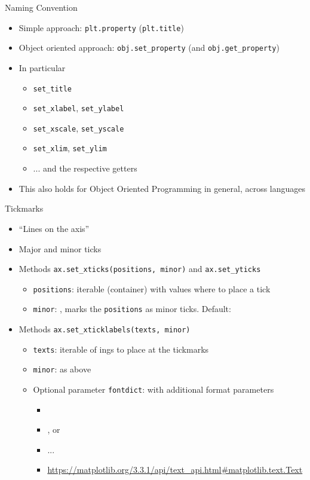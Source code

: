 \begin{frame}[fragile]{Naming Convention}
%
\begin{itemize}
\item Simple approach: \texttt{plt.property} (\eg \texttt{plt.title})
\item Object oriented approach: \texttt{obj.set\_property} (and \texttt{obj.get\_property})
\item In particular
	\begin{itemize}
	\item \texttt{set\_title}
	\item \texttt{set\_xlabel}, \texttt{set\_ylabel}
	\item \texttt{set\_xscale}, \texttt{set\_yscale}
	\item \texttt{set\_xlim}, \texttt{set\_ylim}
	\item ... and the respective getters
	\end{itemize}
\item This also holds for Object Oriented Programming in general, across languages
\end{itemize}
%
\end{frame}


\begin{frame}[fragile]{Tickmarks}
%
\begin{itemize}
\item \enquote{Lines on the axis}
\item Major and minor ticks
\item Methods \texttt{ax.set\_xticks(positions, minor)} and \texttt{ax.set\_yticks}
	\begin{itemize}
	\item \texttt{positions}: iterable (container) with values where to place a tick
	\item \texttt{minor}: , marks the \texttt{positions} as minor ticks. Default: 
	\end{itemize}
\item Methods \texttt{ax.set\_xticklabels(texts, minor)}
	\begin{itemize}
	\item \texttt{texts}: iterable of ings to place at the tickmarks
	\item \texttt{minor}: as above
	\item Optional parameter \texttt{fontdict}:  with additional format parameters
		\begin{itemize}
		\item {} \thus {}
		\item {} \thus {}, \eg {} or 
		\item ...
		\item \url{https://matplotlib.org/3.3.1/api/text_api.html#matplotlib.text.Text}
		\end{itemize}
	\end{itemize}
\end{itemize}
%
\end{frame}

